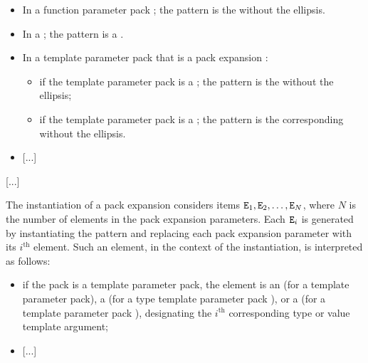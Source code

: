 \documentclass{wg21}
\begin{document}
\begin{itemize}
\item In a function parameter pack ; the pattern is the
 without the ellipsis.

\item In a  ;
the pattern is a .

\item In a template parameter pack that is a pack expansion \iref{}:
\begin{itemize}
    \item
    if the template parameter pack is a ;
    the pattern is the  without the ellipsis;

    \item
    if the template parameter pack is a ;
    the pattern is the corresponding 
    without the ellipsis. %

\end{itemize}

\item \textcolor{noteclr}{[...]}
\end{itemize}

\textcolor{noteclr}{[...]}

\pnum
The instantiation of a pack expansion considers
items $\texttt{E}_1, \texttt{E}_2, \dotsc, \texttt{E}_N$,
where
$N$ is the number of elements in the pack expansion parameters.
Each $\texttt{E}_i$ is generated by instantiating the pattern and
replacing each pack expansion parameter with its $i^\text{th}$ element.
Such an element, in the context of the instantiation, is interpreted as
follows:
\begin{itemize}
    \item
    if the pack is a template parameter pack, the element is
    an 
    (for a  template parameter pack),
    a 
    (for a type template parameter pack ), or
    a 
    (for a  template parameter pack ),
    designating the $i^\text{th}$ corresponding type or value template argument;

\item \textcolor{noteclr}{[...]}
\end{itemize}
\end{document}
